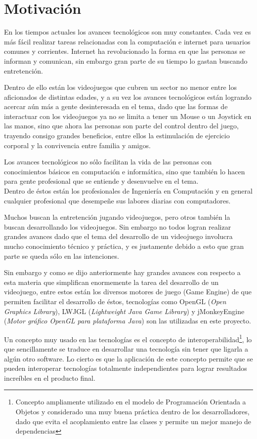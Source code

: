 \documentclass[a4paper,12pt,openany,oneside]{book}
\begin{document}
\section{Motivación}
En los tiempos actuales los avances tecnológicos son muy constantes. Cada vez es más fácil realizar tareas relacionadas con la computación e internet para usuarios comunes y corrientes. Internet ha revolucionado la forma en que las personas se informan y comunican, sin embargo gran parte de su tiempo lo gastan buscando entretención.

Dentro de ello están los videojuegos que cubren un sector no menor entre los aficionados de distintas edades, y a su vez los avances tecnológicos están logrando acercar aún más a gente desinteresada en el tema, dado que las formas de interactuar con los videojuegos ya no se limita a tener un Mouse o un Joystick en las manos, sino que ahora las personas son parte del control dentro del juego, trayendo consigo grandes beneficios, entre ellos la estimulación de ejercicio corporal y la convivencia entre familia y amigos.

Los avances tecnológicos no sólo facilitan la vida de las personas con conocimientos básicos en computación e informática, sino que también lo hacen para gente profesional que se entiende y desenvuelve en el tema.
\\Dentro de éstos están los profesionales de Ingeniería en Computación y en general cualquier profesional que desempeñe sus labores diarias con computadores.

Muchos buscan la entretención jugando videojuegos, pero otros también la buscan desarrollando los videojuegos. Sin embargo no todos logran realizar grandes avances dado que el tema del desarrollo de un videojuego involucra mucho conocimiento técnico y práctica, y es justamente debido a esto que gran parte se queda sólo en las intenciones. 

Sin embargo y como se dijo anteriormente hay grandes avances con respecto a esta materia que simplifican enormemente la tarea del desarrollo de un videojuego, entre estos están los diversos motores de juego (Game Engine) de que permiten facilitar el desarrollo de éstos, tecnologías como OpenGL (\textit{Open Graphics Library}), LWJGL (\textit{Lightweight Java Game Library}) y jMonkeyEngine (\textit{Motor gráfico OpenGL para plataforma Java}) son las utilizadas en este proyecto.

Un concepto muy usado en las tecnologías es el concepto de interoperabilidad\footnote{Concepto ampliamente utilizado en el modelo de Programación Orientada a Objetos y considerado una muy buena práctica dentro de los desarrolladores, dado que evita el acoplamiento entre las clases y permite un mejor manejo de dependencias}, lo que sencillamente se traduce en desarrollar una tecnología sin tener que ligarla a algún otro software. Lo cierto es que la aplicación de este concepto permite que se pueden interoperar tecnologías totalmente independientes para lograr resultados increíbles en el producto final. 
\end{document}
